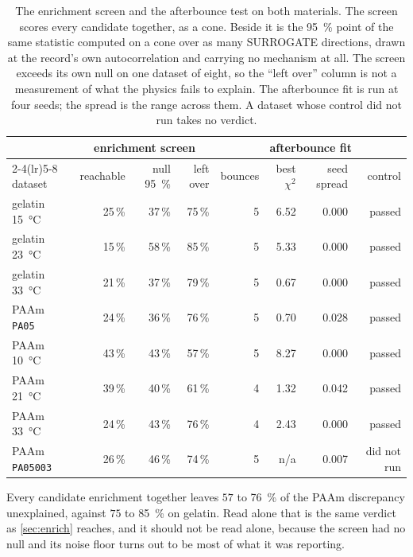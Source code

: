 \documentclass[10pt]{article}
\begin{document}
\begin{table}[htbp]
\centering
\caption{The enrichment screen and the afterbounce test on both materials. The screen scores
every candidate together, as a cone. Beside it is the \SI{95}{\percent} point of the same
statistic computed on a cone over as many SURROGATE directions, drawn at the record's own
autocorrelation and carrying no mechanism at all. The screen exceeds its own null on one dataset
of eight, so the ``left over'' column is not a measurement of what the physics fails to explain.
The afterbounce fit is run at four seeds; the spread is the range across them. A dataset whose
control did not run takes no verdict.}
\label{tab:paamtwo}
\begin{tabular}{lrrrrrrr}
\toprule
& \multicolumn{3}{c}{enrichment screen} & \multicolumn{4}{c}{afterbounce fit} \\
\cmidrule(lr){2-4}\cmidrule(lr){5-8}
dataset & reachable & null \SI{95}{\percent} & left over & bounces & best $\chi^2$ & seed spread & control \\
\midrule
gelatin \SI{15}{\celsius} & 25\,\% & 37\,\% & 75\,\% & 5 & 6.52 & 0.000 & passed \\
gelatin \SI{23}{\celsius} & 15\,\% & 58\,\% & 85\,\% & 5 & 5.33 & 0.000 & passed \\
gelatin \SI{33}{\celsius} & 21\,\% & 37\,\% & 79\,\% & 5 & 0.67 & 0.000 & passed \\
\midrule
PAAm \texttt{PA05} & 24\,\% & 36\,\% & 76\,\% & 5 & 0.70 & 0.028 & passed \\
PAAm \SI{10}{\celsius} & 43\,\% & 43\,\% & 57\,\% & 5 & 8.27 & 0.000 & passed \\
PAAm \SI{21}{\celsius} & 39\,\% & 40\,\% & 61\,\% & 4 & 1.32 & 0.042 & passed \\
PAAm \SI{33}{\celsius} & 24\,\% & 43\,\% & 76\,\% & 4 & 2.43 & 0.000 & passed \\
PAAm \texttt{PA05003} & 26\,\% & 46\,\% & 74\,\% & 5 & n/a & 0.007 & did not run \\
\bottomrule
\end{tabular}
\end{table}

Every candidate enrichment together leaves $57$ to \SI{76}{\percent} of the PAAm discrepancy
unexplained, against $75$ to \SI{85}{\percent} on gelatin. Read alone that is the same verdict as
\cref{sec:enrich} reaches, and it should not be read alone, because the screen had no null and
its noise floor turns out to be most of what it was reporting.
\end{document}
